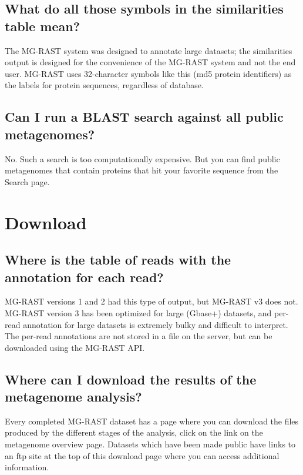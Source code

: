 \documentclass[letterpaper,10pt,english]{sphinxmanual}
\begin{document}
\subsection{What do all those symbols in the similarities table mean?}
\label{\detokenize{user_manual:what-do-all-those-symbols-in-the-similarities-table-mean}}
The MG-RAST system was designed to annotate large datasets; the
similarities output is designed for the convenience of the MG-RAST
system and not the end user. MG-RAST uses 32-character symbols like this
 (md5 protein identifiers) as the
labels for protein sequences, regardless of database.


\subsection{Can I run a BLAST search against all public metagenomes?}
\label{\detokenize{user_manual:can-i-run-a-blast-search-against-all-public-metagenomes}}
No. Such a search is too computationally expensive. But you can find
public metagenomes that contain proteins that hit your favorite sequence
from the Search page.


\section{Download}
\label{\detokenize{user_manual:download}}

\subsection{Where is the table of reads with the annotation for each read?}
\label{\detokenize{user_manual:where-is-the-table-of-reads-with-the-annotation-for-each-read}}
MG-RAST versions 1 and 2 had this type of output, but MG-RAST v3 does
not. MG-RAST version 3 has been optimized for large (Gbase+) datasets,
and per-read annotation for large datasets is extremely bulky and
difficult to interpret. The per-read annotations are not stored in a
file on the server, but can be downloaded using the MG-RAST API.


\subsection{Where can I download the results of the metagenome analysis?}
\label{\detokenize{user_manual:where-can-i-download-the-results-of-the-metagenome-analysis}}
Every completed MG-RAST dataset has a page where you can download the
files produced by the different stages of the analysis, click on the
link on the metagenome overview page. Datasets which have been made
public have links to an ftp site at the top of this download page where
you can access additional information.
\end{document}
